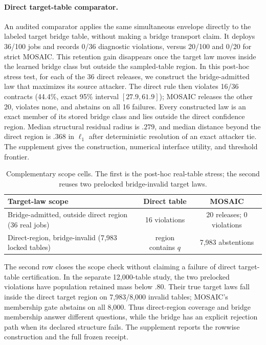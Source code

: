 \paragraph{Direct target-table comparator.}
An audited comparator applies the same simultaneous envelope directly to the
labeled target bridge table, without making a bridge transport claim. It
deploys 36/100 jobs and records 0/36 diagnostic violations, versus 20/100 and
0/20 for strict MOSAIC. This retention gain disappears once the target law
moves inside the learned bridge class but outside the sampled-table region.
In this post-hoc stress test, for each of the 36 direct releases, we construct
the bridge-admitted law that
maximizes its source attacker. The direct rule then violates 16/36 contracts
(44.4\%, exact 95\% interval $[27.9,61.9]$); MOSAIC releases the other 20,
violates none, and abstains on all 16 failures. Every constructed law is an
exact member of its stored bridge class and lies outside the direct confidence
region. Median structural residual radius is $.279$, and median distance beyond
the direct region is $.368$ in $\ell_1$ after deterministic resolution of an
exact attacker tie. The supplement gives the construction,
numerical interface utility, and threshold frontier.

\begin{table}[t]
\centering
\scriptsize
\setlength{\tabcolsep}{3.2pt}
\begin{tabular}{p{}cc}
\hline
Target-law scope & Direct table & MOSAIC \\
\hline
Bridge-admitted, outside direct region (36 real jobs) & 16 violations & 20 releases; 0 violations \\
Direct-region, bridge-invalid (7,983 locked tables) & region contains $q$ & 7,983 abstentions \\
\hline
\end{tabular}
\caption{Complementary scope cells. The first is the post-hoc real-table
stress; the second reuses two prelocked bridge-invalid target laws.}
\label{tab:scope-cells}
\end{table}

The second row closes the scope check without claiming a failure of direct
target-table certification. In the separate 12,000-table study, the two
prelocked violations have population retained mass below $.80$. Their true
target laws fall inside the direct target region on 7,983/8,000 invalid tables;
MOSAIC's membership gate abstains on all 8,000. Thus direct-region coverage and
bridge membership answer different questions, while the bridge has an explicit
rejection path when its declared structure fails. The supplement reports the
rowwise construction and the full frozen receipt.

